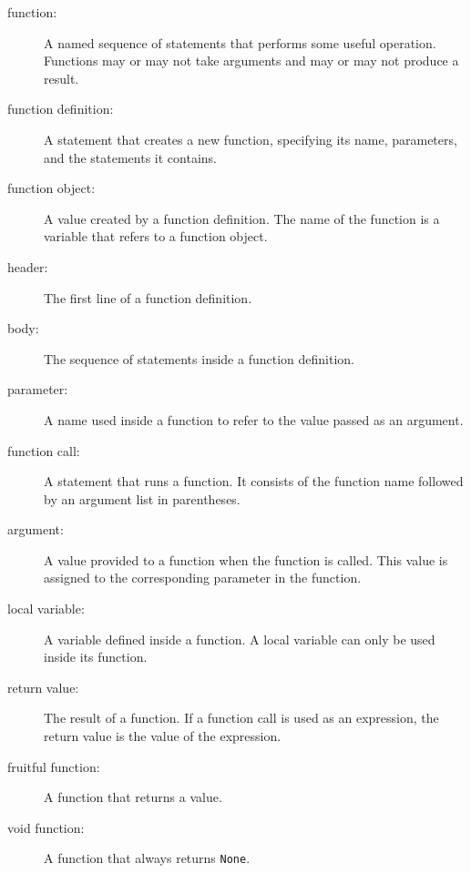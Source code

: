 \documentclass[10pt]{book}
\begin{document}
\begin{description}

\item[function:] A named sequence of statements that performs some
useful operation.  Functions may or may not take arguments and may or
may not produce a result.

\item[function definition:]  A statement that creates a new function,
specifying its name, parameters, and the statements it contains.

\item[function object:]  A value created by a function definition.
The name of the function is a variable that refers to a function
object.

\item[header:] The first line of a function definition.

\item[body:] The sequence of statements inside a function definition.

\item[parameter:] A name used inside a function to refer to the value
passed as an argument.

\item[function call:] A statement that runs a function. It
consists of the function name followed by an argument list in
parentheses.

\item[argument:]  A value provided to a function when the function is called.
This value is assigned to the corresponding parameter in the function.

\item[local variable:]  A variable defined inside a function.  A local
variable can only be used inside its function.

\item[return value:]  The result of a function.  If a function call
is used as an expression, the return value is the value of
the expression.

\item[fruitful function:] A function that returns a value.

\item[void function:] A function that always returns {\tt None}.


\end{description}
\end{document}
